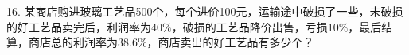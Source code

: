 16.	某商店购进玻璃工艺品500个，每个进价100元，运输途中破损了一些，未破损的好工艺品卖完后，利润率为40$\%$，破损的工艺品降价出售，亏损10$\%$，最后结算，商店总的利润率为38.6$\%$，商店卖出的好工艺品有多少个？



